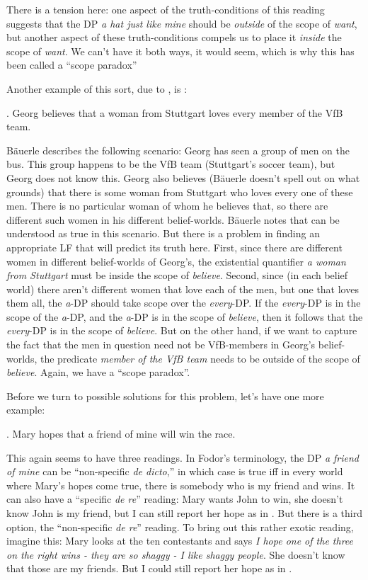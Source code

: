 There is a tension here: one aspect of the truth-conditions of this reading suggests that the DP \emph{a hat just like mine} should be \emph{outside} of the scope of \emph{want}, but another aspect of these truth-conditions compels us to place it \emph{inside} the scope of \emph{want}. We can't have it both ways, it would seem, which is why this has been called a ``scope paradox''

Another example of this sort, due to \citet{bauerle:1983:nps}, is \Next:

\ex. Georg believes that a woman from Stuttgart loves every member of the VfB team.

Bäuerle describes the following scenario: Georg has seen a group of men on the bus. This group happens to be the VfB team (Stuttgart's soccer team), but Georg does not know this. Georg also believes (Bäuerle doesn't spell out on what grounds) that there is some woman from Stuttgart who loves every one of these men. There is no particular woman of whom he believes that, so there are different such women in his different belief-worlds. Bäuerle notes that \Last can be understood as true in this scenario. But there is a problem in finding an appropriate LF that will predict its truth here. First, since there are different women in different belief-worlds of Georg's, the existential quantifier \emph{a woman from Stuttgart} must be inside the scope of \emph{believe}. Second, since (in each belief world) there aren't different women that love each of the men, but one that loves them all, the \emph{a}-DP should take scope over the \emph{every}-DP. If the \emph{every}-DP is in the scope of the \emph{a}-DP, and the \emph{a}-DP is in the scope of \emph{believe}, then it follows that the \emph{every}-DP is in the scope of \emph{believe}. But on the other hand, if we want to capture the fact that the men in question need not be VfB-members in Georg's belief-worlds, the predicate \emph{member of the VfB team} needs to be outside of the scope of \emph{believe}. Again, we have a ``scope paradox''.

Before we turn to possible solutions for this problem, let's have one
more example:

\ex. Mary hopes that a friend of mine will win the race.

This again seems to have three readings. In Fodor's terminology, the DP \emph{a friend of mine} can be ``non-specific \emph{de dicto},'' in which case \Last is true iff in every world where Mary's hopes come true, there is somebody who is my friend and wins. It can also have a ``specific \emph{de re}'' reading: Mary wants John to win, she doesn't know John is my friend, but I can still report her hope as in \Last. But there is a third option, the ``non-specific \emph{de re}'' reading. To bring out this rather exotic reading, imagine this: Mary looks at the ten contestants and says \emph{I hope one of the three on the right wins - they are so shaggy - I like shaggy people}. She doesn't know that those are my friends. But I could still report her hope as in \Last.

